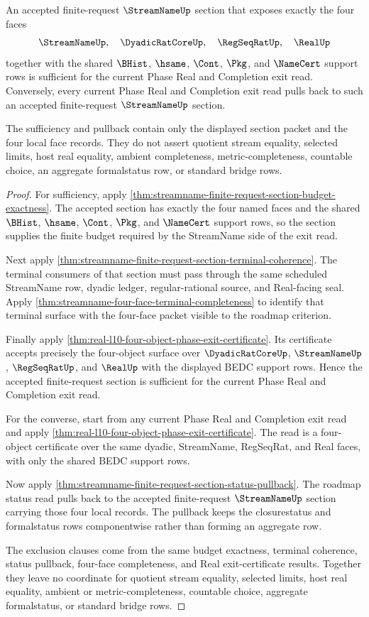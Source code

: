 \begin{theorem}
\label{thm:streamname-finite-request-phase-exit-sufficiency}
An accepted finite-request $\StreamNameUp$ section that exposes exactly the
four faces
$$
\StreamNameUp,\quad \DyadicRatCoreUp,\quad \RegSeqRatUp,\quad \RealUp
$$
together with the shared $\BHist$, $\hsame$, $\Cont$, $\Pkg$, and $\NameCert$
support rows is sufficient for the current Phase Real and Completion exit
read. Conversely, every current Phase Real and Completion exit read pulls back
to such an accepted finite-request $\StreamNameUp$ section.

The sufficiency and pullback contain only the displayed section packet and the
four local face records. They do not assert quotient stream equality, selected
limits, host real equality, ambient completeness, metric-completeness, countable
choice, an aggregate formalstatus row, or standard bridge rows.
\end{theorem}
\begin{proof}
For sufficiency, apply
\autoref{thm:streamname-finite-request-section-budget-exactness}. The accepted
section has exactly the four named faces and the shared $\BHist$, $\hsame$,
$\Cont$, $\Pkg$, and $\NameCert$ support rows, so the section supplies the
finite budget required by the StreamName side of the exit read.

Next apply
\autoref{thm:streamname-finite-request-section-terminal-coherence}. The
terminal consumers of that section must pass through the same scheduled
StreamName row, dyadic ledger, regular-rational source, and Real-facing seal.
Apply \autoref{thm:streamname-four-face-terminal-completeness} to identify that
terminal surface with the four-face packet visible to the roadmap criterion.

Finally apply
\autoref{thm:real-l10-four-object-phase-exit-certificate}. Its certificate
accepts precisely the four-object surface over $\DyadicRatCoreUp$,
$\StreamNameUp$, $\RegSeqRatUp$, and $\RealUp$ with the displayed BEDC support
rows. Hence the accepted finite-request section is sufficient for the current
Phase Real and Completion exit read.

For the converse, start from any current Phase Real and Completion exit read and
apply \autoref{thm:real-l10-four-object-phase-exit-certificate}. The read is a
four-object certificate over the same dyadic, StreamName, RegSeqRat, and Real
faces, with only the shared BEDC support rows.

Now apply
\autoref{thm:streamname-finite-request-section-status-pullback}. The roadmap
status read pulls back to the accepted finite-request $\StreamNameUp$ section
carrying those four local records. The pullback keeps the closurestatus and
formalstatus rows componentwise rather than forming an aggregate row.

The exclusion clauses come from the same budget exactness, terminal coherence,
status pullback, four-face completeness, and Real exit-certificate results.
Together they leave no coordinate for quotient stream equality, selected
limits, host real equality, ambient or metric-completeness, countable choice,
aggregate formalstatus, or standard bridge rows.
\end{proof}
